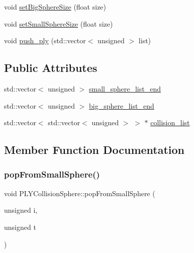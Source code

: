 \begin{DoxyCompactItemize}
void \hyperlink{class_p_l_y_collision_sphere_acf52aecaf0bf676087035151e6c662c9}{set\+Big\+Sphere\+Size} (float size)
\item 
void \hyperlink{class_p_l_y_collision_sphere_af9ba1a8616bb5703e58f392f45c6c069}{set\+Small\+Sphere\+Size} (float size)
\item 
void \hyperlink{class_p_l_y_collision_sphere_a10e46dea74b839faf34872028eafae46}{push\+\_\+ply} (std\+::vector$<$ unsigned $>$ list)
\end{DoxyCompactItemize}
\subsection*{Public Attributes}
\begin{DoxyCompactItemize}
\item 
std\+::vector$<$ unsigned $>$ \hyperlink{class_p_l_y_collision_sphere_a7fd18a4a8a9dbb2f7104f9b9a5dd6766}{small\+\_\+sphere\+\_\+list\+\_\+end}
\item 
std\+::vector$<$ unsigned $>$ \hyperlink{class_p_l_y_collision_sphere_aadf7b345b8c91791fa96e00862bc8cbb}{big\+\_\+sphere\+\_\+list\+\_\+end}
\item 
std\+::vector$<$ std\+::vector$<$ unsigned $>$ $>$ $\ast$ \hyperlink{class_p_l_y_collision_sphere_a6ef04af98385142ed0b41a2e35f423b9}{collision\+\_\+list}
\end{DoxyCompactItemize}


\subsection{Member Function Documentation}
\mbox{\label{class_p_l_y_collision_sphere_adc8f318a913935cdd31d81f1c96192eb}} 
\subsubsection{\texorpdfstring{pop\+From\+Small\+Sphere()}{popFromSmallSphere()}}
{\footnotesize\ttfamily void P\+L\+Y\+Collision\+Sphere\+::pop\+From\+Small\+Sphere (\begin{DoxyParamCaption}\item[{unsigned}]{i,  }\item[{unsigned}]{t }\end{DoxyParamCaption})}



